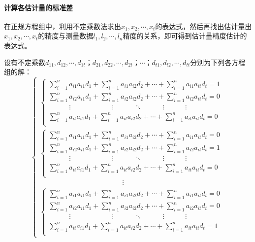 \documentclass{ctexart}
\begin{document}
				\paragraph{计算各估计量的标准差}
					在正规方程组中，利用不定乘数法求出$x_1,x_2,\cdots,x_t$的表达式，然后再找出估计量出$x_1,x_2,\cdots,x_t$的精度与测量数据$l_1,l_2,\cdots,l_n$精度的关系，即可得到估计量精度估计的表达式。\par
					设有不定乘数$d_{11},d_{12},\cdots,d_{1t}；d_{21},d_{22},\cdots,d_{2t}；\cdots；d_{t1},d_{t2},\cdots,d_{tt}$分别为下列各方程组的解：
				\begin{equation*}
					\begin{cases}
						\begin{cases}
						\sum \limits_{i=1}^n a_{i1}a_{i1}d_1+\sum \limits_{i=1}^n a_{i1}a_{i2}d_2+\cdots+\sum \limits_{i=1}^n a_{i1}a_{it}d_t=1\\
						\sum \limits_{i=1}^n a_{i2}a_{i1}d_1+\sum \limits_{i=1}^n a_{i2}a_{i2}d_2+\cdots+\sum \limits_{i=1}^n a_{i2}a_{it}d_t=0\\
						\qquad \quad\vdots\qquad \qquad  \qquad \vdots \qquad \quad \ddots\qquad \quad \vdots \quad \qquad \vdots\\
						\sum \limits_{i=1}^n a_{it}a_{i1}d_1+\sum \limits_{i=1}^n a_{it}a_{i2}d_2+\cdots+\sum \limits_{i=1}^n a_{it}a_{it}d_t=0\\
						\end{cases}
						\\
						\begin{cases}
							\sum \limits_{i=1}^n a_{i1}a_{i1}d_1+\sum \limits_{i=1}^n a_{i1}a_{i2}d_2+\cdots+\sum \limits_{i=1}^n a_{i1}a_{it}d_t=0\\
							\sum \limits_{i=1}^n a_{i2}a_{i1}d_1+\sum \limits_{i=1}^n a_{i2}a_{i2}d_2+\cdots+\sum \limits_{i=1}^n a_{i2}a_{it}d_t=1\\
							\qquad \quad\vdots\qquad \qquad  \qquad \vdots \qquad \quad \ddots\qquad \quad \vdots \quad \qquad \vdots\\
							\sum \limits_{i=1}^n a_{it}a_{i1}d_1+\sum \limits_{i=1}^n a_{it}a_{i2}d_2+\cdots+\sum \limits_{i=1}^n a_{it}a_{it}d_t=0\\
						\end{cases}
						\\
						\qquad\qquad\qquad\qquad\qquad\qquad\vdots
						\\
						\begin{cases}
							\sum \limits_{i=1}^n a_{i1}a_{i1}d_1+\sum \limits_{i=1}^n a_{i1}a_{i2}d_2+\cdots+\sum \limits_{i=1}^n a_{i1}a_{it}d_t=0\\
							\sum \limits_{i=1}^n a_{i2}a_{i1}d_1+\sum \limits_{i=1}^n a_{i2}a_{i2}d_2+\cdots+\sum \limits_{i=1}^n a_{i2}a_{it}d_t=0\\
							\qquad \quad\vdots\qquad \qquad  \qquad \vdots \qquad \quad \ddots\qquad \quad \vdots \quad \qquad \vdots\\
							\sum \limits_{i=1}^n a_{it}a_{i1}d_1+\sum \limits_{i=1}^n a_{it}a_{i2}d_2+\cdots+\sum \limits_{i=1}^n a_{it}a_{it}d_t=1\\
						\end{cases}
					\end{cases}
				\end{equation*}
\end{document}
